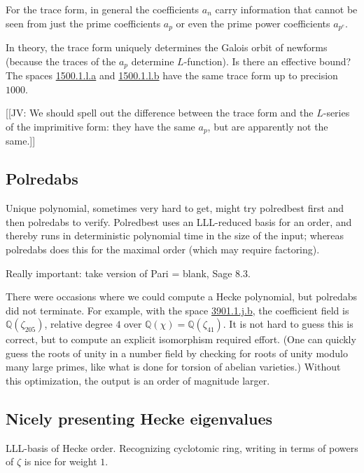 \documentclass[11pt]{amsart}
\numberwithin{equation}{subsection}
\theoremstyle{plain}
\theoremstyle{definition}
\newcommand{\Q}{\mathbb{Q}}
\newcommand{\jv}[1]{{\color{red} \textsf{[[JV: #1]]}}}
\begin{document}
For the trace form, in general the coefficients $a_n$ carry information that cannot be seen from just the prime coefficients $a_p$ or even the prime power coefficients $a_{p^e}$.

In theory, the trace form uniquely determines the Galois orbit of newforms (because the traces of the $a_p$ determine $L$-function).  Is there an effective bound?  The spaces \href{http://cmfs.lmfdb.xyz/ModularForm/GL2/Q/holomorphic/1500/1/l/a/}{\textsf{1500.1.l.a}} and \href{http://cmfs.lmfdb.xyz/ModularForm/GL2/Q/holomorphic/1500/1/l/b/}{\textsf{1500.1.l.b}} have the same trace form up to precision $1000$.  

\jv{We should spell out the difference between the trace form and the $L$-series of the imprimitive form: they have the same $a_p$, but are apparently not the same.}

\subsection{Polredabs}

Unique polynomial, sometimes very hard to get, might try polredbest first and then polredabs to verify.  Polredbest uses an LLL-reduced basis for an order, and thereby runs in deterministic polynomial time in the size of the input; whereas polredabs does this for the maximal order (which may require factoring).

Really important: take version of Pari = blank, Sage 8.3.

There were occasions where we could compute a Hecke polynomial, but polredabs did not terminate.  For example, with the space \href{http://cmfs.lmfdb.xyz/ModularForm/GL2/Q/holomorphic/3901/1/j/b/}{\textsf{3901.1.j.b}}, the coefficient field is $\Q(\zeta_{205})$, relative degree $4$ over $\Q(\chi)=\Q(\zeta_{41})$.  It is not hard to guess this is correct, but to compute an explicit isomorphism required effort.  (One can quickly guess the roots of unity in a number field by checking for roots of unity modulo many large primes, like what is done for torsion of abelian varieties.)  Without this optimization, the output is an order of magnitude larger.

\subsection{Nicely presenting Hecke eigenvalues}  \label{sec:LLLbasis}

LLL-basis of Hecke order.  Recognizing cyclotomic ring, writing in terms of powers of $\zeta$ is nice for weight $1$.
\end{document}
